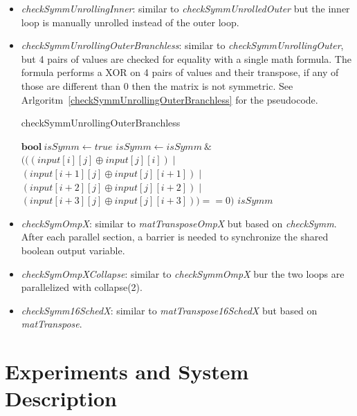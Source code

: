 \documentclass[conference]{IEEEtran}
\begin{document}
\begin{itemize}
\item \textit{checkSymmUnrollingInner}: similar to \textit{checkSymmUnrolledOuter} but the inner loop is manually unrolled instead of the outer loop.
\item \textit{checkSymmUnrollingOuterBranchless}: similar to \textit{checkSymmUnrollingOuter}, but 4 pairs of values are checked for equality with a single math formula. The formula performs a XOR on 4 pairs of values and their transpose, if any of those are different than 0 then the matrix is not symmetric. See Arlgoritm~\ref{checkSymmUnrollingOuterBranchless} for the pseudocode.


\begin{algorithm}
	\caption{checkSymmUnrollingOuterBranchless}\label{checkSymmUnrollingOuterBranchless}
	\begin{algorithmic}[1]
		\State $\textbf{bool}\ isSymm \gets true$
		\State $isSymm \gets isSymm\ \& $
		\State $(((input[i][j] \oplus input[j][i]) \mid $
		\State $(input[i+1][j] \oplus input[j][i+1]) \mid $
		\State $(input[i+2][j] \oplus input[j][i+2]) \mid $
		\State $(input[i+3][j] \oplus input[j][i+3])) == 0)$
		\EndFor
		\EndFor
		\State \Return $isSymm$
	\end{algorithmic}
\end{algorithm}

\item \textit{checkSymOmpX}: similar to \textit{matTransposeOmpX} but based on \textit{checkSymm}. After each parallel section, a barrier is needed to synchronize the shared boolean output variable.
\item \textit{checkSymOmpXCollapse}: similar to \textit{checkSymmOmpX} bur the two loops are parallelized with collapse(2).
\item \textit{checkSymm16SchedX}: similar to \textit{matTranspose16SchedX} but based on \textit{matTranspose}.
\end{itemize}

\section{Experiments and System Description}
\end{document}
